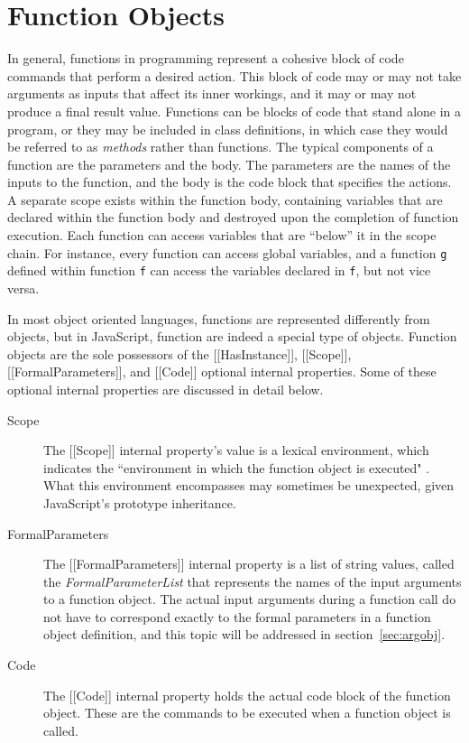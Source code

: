 \documentclass[a4paper,11pt,twoside]{report}
\def\jsinline{\lstinline[language=JavaScript, basicstyle=\small]}%\end{lstlisting}
\begin{document}
\vspace*{-0.7cm}
\section{Function Objects}
In general, functions in programming represent a cohesive block of code commands that perform a desired action. This block of code may or may not take arguments as inputs that affect its inner workings, and it may or may not produce a final result value. Functions can be blocks of code that stand alone in a program, or they may be included in class definitions, in which case they would be referred to as \textit{methods} rather than functions. The typical components of a function are the parameters and the body. The parameters are the names of the inputs to the function, and the body is the code block that specifies the actions. A separate scope exists within the function body, containing variables that are declared within the function body and destroyed upon the completion of function execution. Each function can access variables that are ``below'' it in the scope chain. For instance, every function can access global variables, and a function \jsinline|g| defined within function \jsinline|f| can access the variables declared in \jsinline|f|, but not vice versa.

In most object oriented languages, functions are represented differently from objects, but in JavaScript, function are indeed a special type of objects. Function objects are the sole possessors of the [[HasInstance]], [[Scope]], [[FormalParameters]], and [[Code]] optional internal properties. Some of these optional internal properties are discussed in detail below.

\begin{description}
\item[Scope] The [[Scope]] internal property's value is a lexical environment, which indicates the ``environment in which the function object is executed" \cite{EcmaScript}. What this environment encompasses may sometimes be unexpected, given JavaScript's prototype inheritance.

\item[FormalParameters] The [[FormalParameters]] internal property is a list of string values, called the \textit{FormalParameterList} that represents the names of the input arguments to a function object. The actual input arguments during a function call do not have to correspond exactly to the formal parameters in a function object definition, and this topic will be addressed in section~\ref{sec:argobj}.

\item[Code] The [[Code]] internal property holds the actual code block of the function object. These are the commands to be executed when a function object is called.
\end{description}
\end{document}
